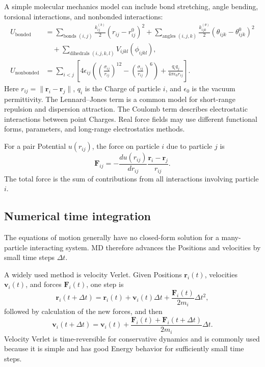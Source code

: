 \documentclass[a4paper, 10pt, onepage]{elegantbook}
\begin{document}
{A simple molecular mechanics model can include bond stretching, angle
bending, torsional interactions, and nonbonded interactions:
\[
\begin{aligned}
U_{\mathrm{bonded}} &=
\sum_{\text{bonds }(i,j)}
 \frac{k_{ij}^{(b)}}{2}(r_{ij}-r_{ij}^{0})^2
+
\sum_{\text{angles }(i,j,k)}
 \frac{k_{ijk}^{(\theta)}}{2}(\theta_{ijk}-\theta_{ijk}^{0})^2
\\
&\quad+
\sum_{\text{dihedrals }(i,j,k,l)}
 V_{ijkl}(\phi_{ijkl}), \\
U_{\mathrm{nonbonded}} &=
\sum_{i<j}
\left[
4\epsilon_{ij}
\left(
\left(\frac{\sigma_{ij}}{r_{ij}}\right)^{12}
-
\left(\frac{\sigma_{ij}}{r_{ij}}\right)^6
\right)
+
\frac{q_iq_j}{4\pi\epsilon_0 r_{ij}}
\right].
\end{aligned}
\]
Here \(r_{ij}=\lVert\bm{r}_i-\bm{r}_j\rVert\), \(q_i\) is the Charge of
particle \(i\), and \(\epsilon_0\) is the vacuum permittivity. The
Lennard--Jones term is a common model for short-range repulsion and
dispersion attraction. The Coulomb term describes electrostatic
interactions between point Charges. Real force fields may use different
functional forms, parameters, and long-range electrostatics methods.

For a pair Potential \(u(r_{ij})\), the force on particle \(i\) due to
particle \(j\) is
\[
\bm{F}_{ij}
=
-\frac{du(r_{ij})}{dr_{ij}}
\frac{\bm{r}_i-\bm{r}_j}{r_{ij}}.
\]
The total force is the sum of contributions from all interactions involving
particle \(i\).

\subsection{Numerical time integration}

The equations of motion generally have no closed-form solution for a
many-particle interacting system. MD therefore advances the Positions and
velocities by small time steps \(\Delta t\).

A widely used method is velocity Verlet. Given Positions \(\bm{r}_i(t)\),
velocities \(\bm{v}_i(t)\), and forces \(\bm{F}_i(t)\), one step is
\[
\bm{r}_i(t+\Delta t)
=
\bm{r}_i(t)
+\bm{v}_i(t)\Delta t
+\frac{\bm{F}_i(t)}{2m_i}\Delta t^2,
\]
followed by calculation of the new forces, and then
\[
\bm{v}_i(t+\Delta t)
=
\bm{v}_i(t)
+\frac{\bm{F}_i(t)+\bm{F}_i(t+\Delta t)}{2m_i}\Delta t.
\]
Velocity Verlet is time-reversible for conservative dynamics and is
commonly used because it is simple and has good Energy behavior for
sufficiently small time steps.

}
\end{document}
